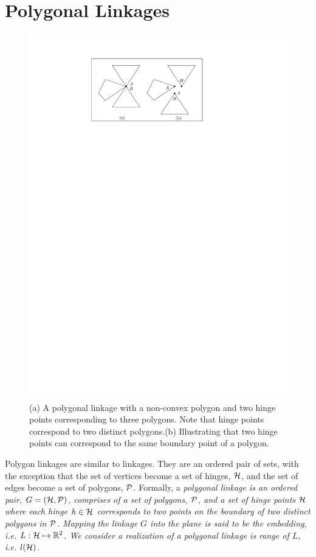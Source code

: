 \section{Polygonal Linkages}
\begin{figure}[h]
\begin{center}
\includegraphics[scale=1]{graphics/hingeOnThreeDistinctPolygons.pdf}
\end{center} 
\caption{(a) A polygonal linkage with a non-convex polygon and two hinge points corresponding to 
three polygons.  Note that hinge points correspond to two distinct polygons.(b) Illustrating that 
two hinge points can correspond to the same boundary point of a polygon.}
\label{fig:linkage-1}
\end{figure}
Polygon linkages are similar to linkages.  They are an ordered pair of sets, with the exception 
that the set of vertices become a set of hinges, ${\cal H}$, and the set of edges become a set of 
polygons, ${\cal P}$.  Formally, a \it{polygonal linkage} is an ordered pair, $G = ({\cal H},{\cal P})$,  
comprises of a set of polygons, ${\cal P}$, and a set of hinge points ${\cal H}$ where each hinge $h \in {\cal H}$ 
corresponds to two points on the boundary of two distinct polygons in ${\cal P}$. Mapping the linkage 
$G$ into the plane is said to be the \textit{embedding}, i.e. $L : {\cal H} \mapsto {\mathbb{R}}^{2}$.  We 
consider a \textit{realization} of a polygonal linkage is range of $L$, i.e. $l({\cal H})$.


